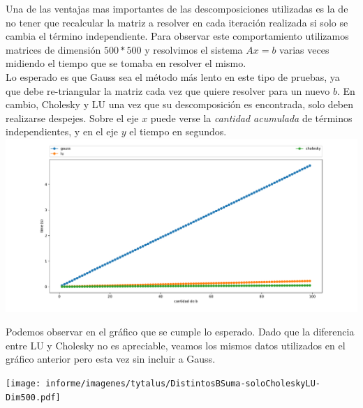 Una de las ventajas mas importantes de las descomposiciones utilizadas es la de no tener que recalcular la matriz a resolver en cada iteración realizada si solo se cambia el término independiente. Para observar este comportamiento utilizamos matrices de dimensión $500*500$ y resolvimos el sistema $Ax = b$ varias veces midiendo el tiempo que se tomaba en resolver el mismo. \\

Lo esperado es que Gauss sea el método más lento en este tipo de pruebas, ya que debe re-triangular la matriz cada vez que quiere resolver para un nuevo $b$. En cambio, Cholesky y LU una vez que su descomposición es encontrada, solo deben realizarse despejes. Sobre el eje $x$ puede verse la \textit{cantidad acumulada} de términos independientes, y en el eje $y$ el tiempo en segundos. \\
\hspace*{-2cm} \includegraphics[scale=0.55]{informe/imagenes/tytalus/DistintosBSuma-Dim500.pdf}

Podemos observar en el gráfico que se cumple lo esperado. Dado que la diferencia entre LU y Cholesky no es apreciable, veamos los mismos datos utilizados en el gráfico anterior pero esta vez sin incluir a Gauss.

\hspace*{-2cm} \texttt{[image: informe/imagenes/tytalus/DistintosBSuma-soloCholeskyLU-Dim500.pdf]}





